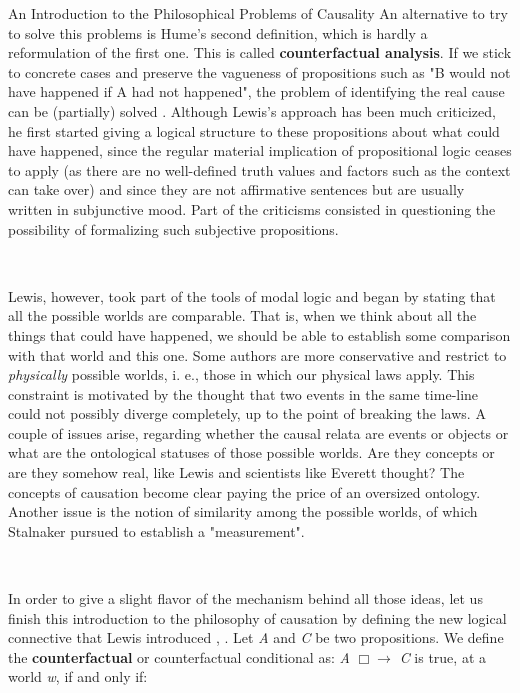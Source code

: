 \documentclass[12pt]{article}
\begin{document}
\begin{section}{An Introduction to the Philosophical Problems of Causality}
An alternative to try to solve this problems is Hume's second definition, which is hardly a reformulation of the first one. This is called \textbf{counterfactual analysis}. If we stick to concrete cases and preserve the vagueness of propositions such as "B would not have happened if A had not happened", the problem of identifying the real cause can be (partially) solved \cite{lewis_causation_1973}. Although Lewis's approach has been much criticized, he first started giving a logical structure to these propositions about what could have happened, since the regular material implication of propositional logic ceases to apply (as there are no well-defined truth values and factors such as the context can take over) and since they are not affirmative sentences but are usually written in subjunctive mood. Part of the criticisms consisted in questioning the possibility of formalizing such subjective propositions.

\

Lewis, however, took part of the tools of modal logic and began by stating that all the possible worlds are comparable. That is, when we think about all the things that could have happened, we should be able to establish some comparison with that world and this one. Some authors are more conservative and restrict to \textit{physically} possible worlds, i. e., those in which our physical laws apply. This constraint is motivated by the thought that two events in the same time-line could not possibly diverge completely, up to the point of breaking the laws. A couple of issues arise, regarding whether the causal relata are events or objects or what are the ontological statuses of those possible worlds. Are they concepts or are they somehow real, like Lewis and scientists like Everett thought? The concepts of causation become clear paying the price of an oversized ontology. Another issue is the notion of similarity among the possible worlds, of which Stalnaker pursued to establish a "measurement".

\

In order to give a slight flavor of the mechanism behind all those ideas, let us finish this introduction to the philosophy of causation by defining the new logical connective that Lewis introduced \cite{lewis_causation_1973}, \cite{collins_causation_2004}. Let \textit{A} and \textit{C} be two propositions. We define the \textbf{counterfactual} or counterfactual conditional as: \textit{A} $\Box \rightarrow$ \textit{C} is true, at a world \textit{w}, if and only if:


\end{section}
\end{document}
